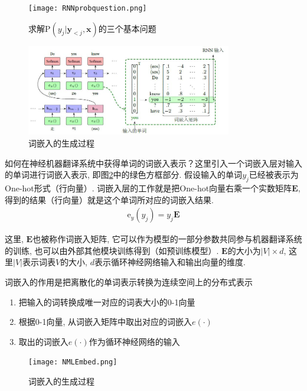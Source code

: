 \begin{figure}[htp]
    \centering
     \texttt{[image: RNNprobquestion.png]}
    \caption{求解$\textrm{P} (y_j | \mathbf{y}_{<j}, \mathbf{x})$的三个基本问题}
    \label{fig:probquestion}
    \end{figure}

\begin{figure}[htp]
\centering
    \includegraphics[width=0.8\textwidth]{figures/MachineTranslation/fig6-12.jpg}
\caption{词嵌入的生成过程}
\label{fig:genWordEmbedded}
\end{figure}

    \parinterval 如何在神经机器翻译系统中获得单词的词嵌入表示？这里引入一个词嵌入层对输入的单词进行词嵌入表示, 即图\ref{fig:genWordEmbedded}中的绿色方框部分. 假设输入的单词$y_j$已经被表示为One-hot形式（行向量）. 词嵌入层的工作就是把One-hot向量右乘一个实数矩阵$\mathbf{E}$, 得到的结果（行向量）就是这个单词所对应的词嵌入结果. 
    \begin{eqnarray}
    \textrm{e}_y (y_j) = y_j \mathbf{E} 
    \end{eqnarray} 

    \noindent 这里, $\mathbf{E}$也被称作词嵌入矩阵, 它可以作为模型的一部分参数共同参与机器翻译系统的训练, 也可以由外部其他模块训练得到（如预训练模型）. $\mathbf{E}$的大小为$|V| \times d$, 这里$|V|$表示词表$V$的大小, $d$表示循环神经网络输入和输出向量的维度. 
    

    词嵌入的作用是把离散化的单词表示转换为连续空间上的分布式表示
    \begin{enumerate}
        \item   把输入的词转换成唯一对应的词表大小的0-1向量
        \item 根据0-1向量, 从词嵌入矩阵中取出对应的词嵌入$e(\cdot)$
        \item 取出的词嵌入$e(\cdot)$作为循环神经网络的输入
    \end{enumerate} 
  
    
    
\begin{figure}[htp]
    \centering
    \texttt{[image: NMLEmbed.png]}
    \caption{词嵌入的生成过程}
 
    \end{figure}

